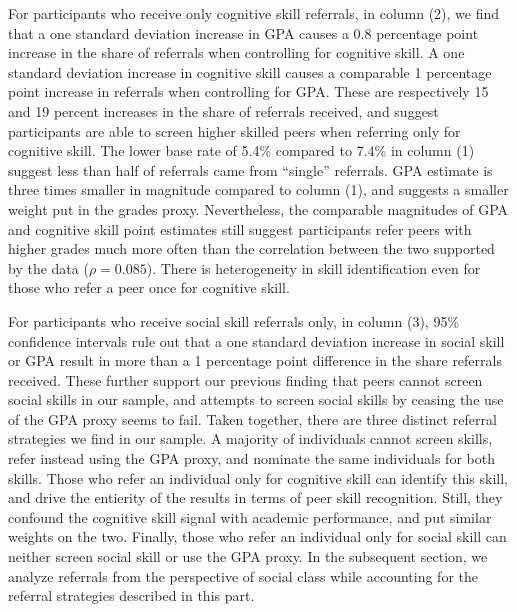 \documentclass[11pt,a4paper,oneside]{article}
\begin{document}
For participants who receive only cognitive skill referrals, in column (2), we find that a one standard deviation increase in GPA causes a 0.8 percentage point increase in the share of referrals when controlling for cognitive skill. A one standard deviation increase in cognitive skill causes a comparable 1 percentage point increase in referrals when controlling for GPA. These are respectively 15 and 19 percent increases in the share of referrals received, and suggest participants are able to screen higher skilled peers when referring only for cognitive skill. The lower base rate of 5.4\% compared to 7.4\% in column (1) suggest less than half of referrals came from ``single'' referrals. GPA estimate is three times smaller in magnitude compared to column (1), and suggests a smaller weight put in the grades proxy. Nevertheless, the comparable magnitudes of GPA and cognitive skill point estimates still suggest participants refer peers with higher grades much more often than the correlation between the two supported by the data ($\rho = 0.085$). There is heterogeneity in skill identification even for those who refer a peer once for cognitive skill. 

For participants who receive social skill referrals only, in column (3), 95\% confidence intervals rule out that a one standard deviation increase in social skill or GPA result in more than a 1 percentage point difference in the share referrals received. These further support our previous finding that peers cannot screen social skills in our sample, and attempts to screen social skills by ceasing the use of the GPA proxy seems to fail. Taken together, there are three distinct referral strategies we find in our sample. A majority of individuals cannot screen skills, refer instead using the GPA proxy, and nominate the same individuals for both skills. Those who refer an individual only for cognitive skill can identify this skill, and drive the entierity of the results in terms of peer skill recognition. Still, they confound the cognitive skill signal with academic performance, and put similar weights on the two. Finally, those who refer an individual only for social skill can neither screen social skill or use the GPA proxy. In the subsequent section, we analyze referrals from the perspective of social class while accounting for the referral strategies described in this part.
\end{document}
